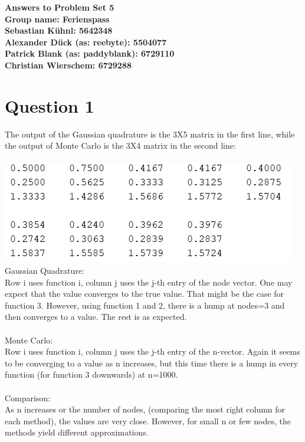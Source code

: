 \documentclass{article}
\begin{document}
	\begin{center}
		\LARGE \bfseries{Answers to Problem Set 5}\\
		Group name: Ferienspass\vspace{.5cm}\\
		\normalsize \normalfont
		Sebastian K\"uhnl: 5642348\\
		Alexander D\"uck (as: reebyte): 5504077\\
		Patrick Blank (as: paddyblank): 6729110\\
		Christian Wierschem: 6729288
	\end{center}
	\normalsize	
	\section{Question 1}
The output of the Gaussian quadrature is the 3X5 matrix in the first line, while the output of Monte Carlo is the 3X4 matrix in the second line:\\\\
	\includegraphics[width = \textwidth, keepaspectratio]{output.png}
	Gaussian Quadrature:\\
	Row i uses function i, column j uses the j-th entry of the node vector. One may expect that the value converges to the true value. That might be the case for function 3. However, using function 1 and 2, there is a hump at nodes=3 and then converges to a value. The rest is as expected.\\\\
	Monte Carlo:\\
	Row i uses function i, column j uses the j-th entry of the n-vector. Again it seems to be converging to a value as n increases, but this time there is a hump in every function (for function 3 downwards) at n=1000.\\\\
	Comparison:\\
	As n increases or the number of nodes, (comparing the most right column for each method), the values are very close. However, for small n or few nodes, the methods yield different approximations.
\end{document}
